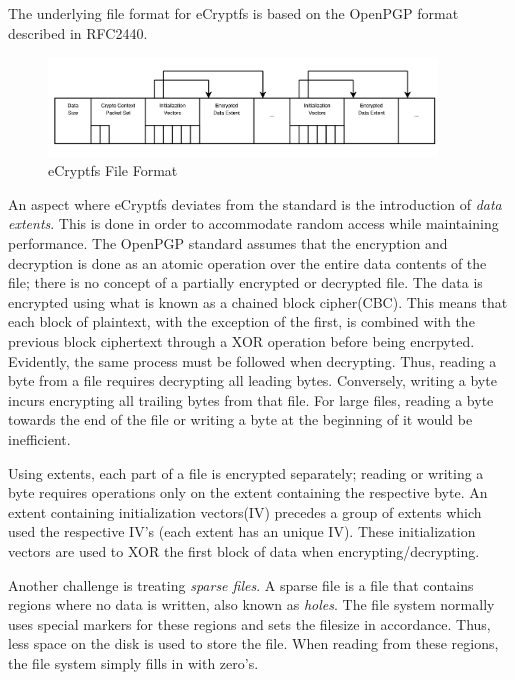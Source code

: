 The underlying file format for eCryptfs is based on the OpenPGP format described in RFC2440\cite{rfc}.

\begin{figure}[h!]
\centering
    \includegraphics[width=0.92\textwidth]{src/img/ecryptfs/fileformat.png}
\caption{eCryptfs File Format\cite{ecryptfs-paper}}
\end{figure}

An aspect where eCryptfs deviates from the standard is the introduction of \textit{data extents}. This is done in order to accommodate random access while maintaining performance. The OpenPGP standard assumes that the encryption and decryption is done as an atomic operation over the entire data contents of the file; there is no concept of a partially encrypted or decrypted file. The data is encrypted using what is known as a chained block cipher(CBC). This means that each block of plaintext, with the exception of the first, is combined with the previous block ciphertext through a XOR operation before being encrpyted. Evidently, the same process must be followed when decrypting. Thus, reading a byte from a file requires decrypting all leading bytes. Conversely, writing a byte incurs encrypting all trailing bytes from that file. For large files, reading a byte towards the end of the file or writing a byte at the beginning of it would be inefficient.

Using extents, each part of a file is encrypted separately; reading or writing a byte requires operations only on the extent containing the respective byte. An extent containing initialization vectors(IV) precedes a group of extents which used the respective IV's (each extent has an unique IV). These initialization vectors are used to XOR the first block of data when encrypting/decrypting.

Another challenge is treating \textit{sparse files}. A sparse file is a file that contains regions where no data is written, also known as \textit{holes}. The file system normally uses special markers for these regions and sets the filesize in accordance. Thus, less space on the disk is used to store the file. When reading from these regions, the file system simply fills in with zero's.

